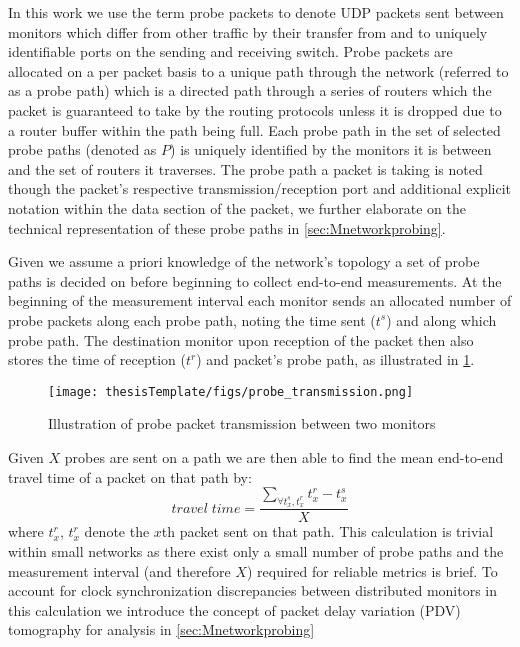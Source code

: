    In this work we use the term probe packets to denote UDP packets sent between monitors which differ from other traffic by their transfer from and to uniquely identifiable ports on the sending and receiving switch. Probe packets are allocated on a per packet basis to a unique path through the network (referred to as a probe path) which is a directed path through a series of routers which the packet is guaranteed to take by the routing protocols unless it is dropped due to a router buffer within the path being full. Each probe path in the set of selected probe paths (denoted as $P$) is uniquely identified by the monitors it is between and the set of routers it traverses. The probe path a packet is taking is noted though the packet's respective transmission/reception port and additional explicit notation within the data section of the packet, we further elaborate on the technical representation of these probe paths in \cref{sec:Mnetworkprobing}.\par
    
    Given we assume a priori knowledge of the network's topology a set of probe paths is decided on before beginning to collect end-to-end measurements. At the beginning of the measurement interval each monitor sends an allocated number of probe packets along each probe path, noting the time sent ($t^s$) and along which probe path. The destination monitor upon reception of the packet then also stores the time of reception ($t^r$) and packet's probe path, as illustrated in \ref{fig:pptransmission}. 
    \begin{figure}[H]
        \centering
        \texttt{[image: thesisTemplate/figs/probe\_transmission.png]}
        \caption[Illustration of probe packet transmission between two monitors]{Illustration of probe packet transmission between two monitors \protect\cite{he_fisher_2015}}
        \label{fig:pptransmission}
    \end{figure}
    Given $X$ probes are sent on a path we are then able to find the mean end-to-end travel time of a packet on that path by: \[travel\;time=\frac{\sum_{\forall  t_x^s, t_x^r}t_x^r - t_x^s}{X}\] where $t_x^r$, $t_x^r$ denote the $x$th packet sent on that path. This calculation is trivial within small networks as there exist only a small number of probe paths and the measurement interval (and therefore $X$) required for reliable metrics is brief. To account for clock synchronization discrepancies between distributed monitors in this calculation we introduce the concept of packet delay variation (PDV) tomography for analysis in \cref{sec:Mnetworkprobing} \par

